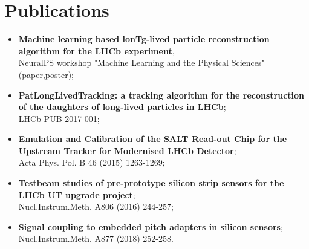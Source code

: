 \newpage

\section*{Publications}
			\begin{itemize}
			    \item \textbf{Machine learning based lonTg-lived particle reconstruction algorithm for the LHCb experiment},\\ NeuralPS workshop "Machine Learning and the Physical Sciences"  (\textcolor{red}{\href{https://ml4physicalsciences.github.io/2020/files/NeurIPS_ML4PS_2020_148.pdf}{paper}},\textcolor{red}{\href{https://ml4physicalsciences.github.io/2020/files/NeurIPS_ML4PS_2020_148_poster.pdf}{poster}});
			    \item \textbf{PatLongLivedTracking: a tracking algorithm for the reconstruction of the daughters of long-lived particles in LHCb};\\ LHCb-PUB-2017-001;
				\item \textbf{Emulation and Calibration of the SALT Read-out Chip for the Upstream Tracker for Modernised LHCb Detector}; \\
				Acta Phys. Pol. B 46 (2015) 1263-1269;
				\item \textbf{Testbeam studies of pre-prototype silicon strip sensors for the LHCb UT upgrade project};  \\
				Nucl.Instrum.Meth. A806 (2016) 244-257;
				\item \textbf{Signal coupling to embedded pitch adapters in silicon sensors};\\
				Nucl.Instrum.Meth. A877 (2018) 252-258.
			\end{itemize}

